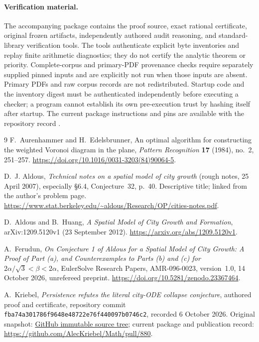 \documentclass[11pt]{article}
\begin{document}
\paragraph{Verification material.}
The accompanying package contains the proof source, exact rational certificate, original frozen artifacts, independently authored audit reasoning, and standard-library verification tools. The tools authenticate explicit byte inventories and replay finite arithmetic diagnostics; they do not certify the analytic theorem or priority. Complete-corpus and primary-PDF provenance checks require separately supplied pinned inputs and are explicitly not run when those inputs are absent. Primary PDFs and raw corpus records are not redistributed. Startup code and the inventory digest must be authenticated independently before executing a checker; a program cannot establish its own pre-execution trust by hashing itself after startup. The current package instructions and pins are available with the repository record \cite{Kri26}.

\begin{thebibliography}{9}
F.~Aurenhammer and H.~Edelsbrunner, An optimal algorithm for constructing the weighted Voronoi diagram in the plane, \emph{Pattern Recognition} \textbf{17} (1984), no.~2, 251--257.
\url{https://doi.org/10.1016/0031-3203(84)90064-5}.

D.~J. Aldous, \emph{Technical notes on a spatial model of city growth} (rough notes, 25 April 2007), especially \S6.4, Conjecture~32, p.~40. Descriptive title; linked from the author's problem page.
\url{https://www.stat.berkeley.edu/~aldous/Research/OP/cities-notes.pdf}.

D.~Aldous and B.~Huang, \emph{A Spatial Model of City Growth and Formation}, arXiv:1209.5120v1 (23 September 2012).
\url{https://arxiv.org/abs/1209.5120v1}.

A.~Ferudun, \emph{On Conjecture 1 of Aldous for a Spatial Model of City Growth: A Proof of Part (a), and Counterexamples to Parts (b) and (c) for $2\alpha/\sqrt3<\beta<2\alpha$}, EulerSolve Research Papers, AMR-096-0023, version~1.0, 14 October 2026, unrefereed preprint.
\url{https://doi.org/10.5281/zenodo.23367464}.

A.~Kriebel, \emph{Persistence refutes the literal city-ODE collapse conjecture}, authored proof and certificate, repository commit \texttt{fba74a301786f9648e48722e76f440097b0746c2}, recorded 6 October 2026. Original snapshot:
\href{https://github.com/AlecKriebel/Math/tree/fba74a301786f9648e48722e76f440097b0746c2/unsolved_math_prioritization/attempts/9700026}{GitHub immutable source tree}; current package and publication record:
\url{https://github.com/AlecKriebel/Math/pull/880}.
\end{thebibliography}
\end{document}
